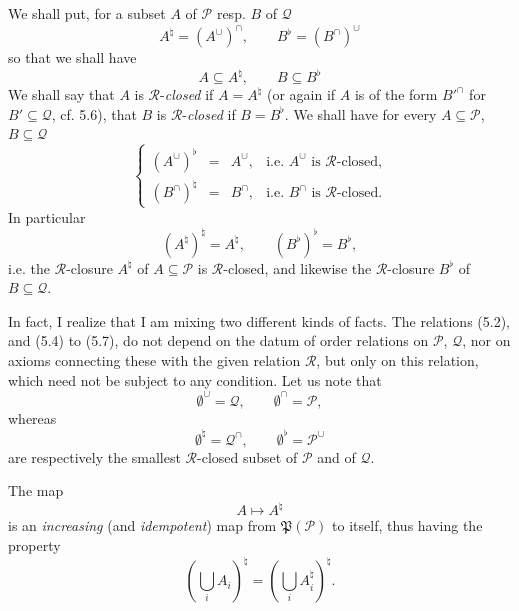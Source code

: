\documentclass[11pt]{article}
\newcommand{\printedpage}[1]{\marginpar{\footnotesize p.~#1}}
\newcommand{\msp}[1]{\marginpar{\footnotesize [#1]}}
\newcommand{\cP}{\mathcal{P}}
\newcommand{\cQ}{\mathcal{Q}}
\newcommand{\cR}{\mathcal{R}}
\newcommand{\fP}{\mathfrak{P}}
\begin{document}
\printedpage{44}

We shall put, for a subset $A$ of $\cP$ resp. $B$ of $\cQ$
\[
A^{\natural} = (A^{\cup})^{\cap}, \qquad B^{\flat} = (B^{\cap})^{\cup}
\tag*{(5.4)}
\]
so that we shall have
\[
A \subseteq A^{\natural}, \qquad B \subseteq B^{\flat}
\tag*{(5.5)}
\]
We shall say that $A$ is $\cR$-\textit{closed} if $A = A^{\natural}$ (or again if $A$ is of the form $B'^{\cap}$ for $B' \subseteq \cQ$, cf. 5.6), that
\msp{71}
$B$ is $\cR$-\textit{closed} if $B = B^{\flat}$. We shall have for every $A \subseteq \cP$, $B \subseteq \cQ$
\[
\left\{
\begin{array}{rcll}
(A^{\cup})^{\flat} & = & A^{\cup}, & \text{i.e. } A^{\cup} \text{ is } \cR\text{-closed,}\\[1ex]
(B^{\cap})^{\natural} & = & B^{\cap}, & \text{i.e. } B^{\cap} \text{ is } \cR\text{-closed.}
\end{array}
\right.
\tag*{(5.6)}
\]
In particular
\[
(A^{\natural})^{\natural} = A^{\natural}, \qquad (B^{\flat})^{\flat} = B^{\flat},
\tag*{(5.7)}
\]
i.e. the $\cR$-closure $A^{\natural}$ of $A \subseteq \cP$ is $\cR$-closed, and likewise the $\cR$-closure $B^{\flat}$ of $B \subseteq \cQ$. %

In fact, I realize that I am mixing two different kinds of facts. The relations (5.2), and (5.4) to (5.7), do not depend on the datum of order relations on $\cP$, $\cQ$, nor on axioms connecting these with the given relation $\cR$, but only on this relation, which need not be subject to any condition. Let us note that %
\[
\emptyset^{\cup} = \cQ, \qquad \emptyset^{\cap} = \cP,
\tag*{(5.8)}
\]
whereas
\[
\emptyset^{\natural} = \cQ^{\cap}, \qquad \emptyset^{\flat} = \cP^{\cup}
\tag*{(5.9)}
\]
are respectively the smallest $\cR$-closed subset of $\cP$ and of $\cQ$.

The map
\[
A \longmapsto A^{\natural}
\tag*{(5.10)}
\]
is an \textit{increasing} (and \textit{idempotent}) map from $\fP(\cP)$ to itself, thus having the property
\msp{72}
\[
(\bigcup_i A_i)^{\natural} = (\bigcup_i A_i^{\natural})^{\natural}.
\]

\printedpage{45}
\end{document}
